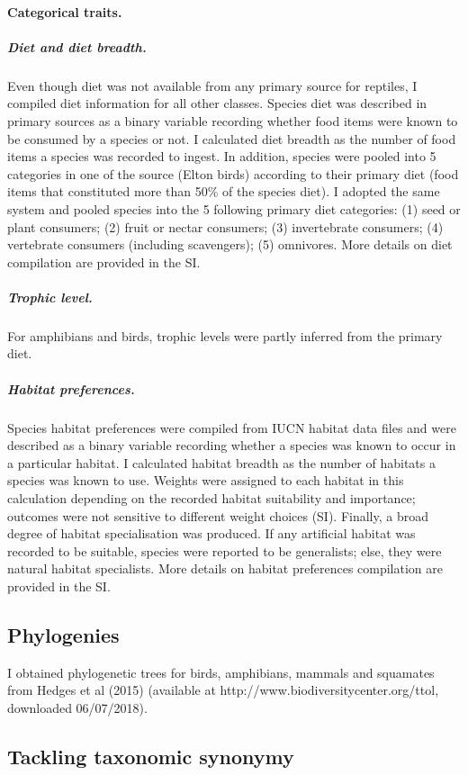 \paragraph{Categorical traits.}
\subparagraph{Diet and diet breadth.} Even though diet was not available from any primary source for reptiles, I compiled diet information for all other classes. Species diet was described in primary sources as a binary variable recording whether food items were known to be consumed by a species or not. I calculated diet breadth as the number of food items a species was recorded to ingest. In addition,  species were pooled into 5 categories in one of the source (Elton birds) according to their primary diet (food items that constituted more than 50\% of the species diet). I adopted the same system and  pooled species into the 5 following primary diet categories: (1) seed or plant consumers; (2) fruit or nectar consumers; (3) invertebrate consumers; (4) vertebrate consumers (including scavengers); (5) omnivores. More details on diet compilation are provided in the SI. 
\subparagraph{Trophic level.} For amphibians and birds, trophic levels were partly inferred from the primary diet. 
\subparagraph{Habitat preferences.}
Species habitat preferences were compiled from IUCN habitat data files and were described as a binary variable recording whether a species was known to occur in a particular habitat. I calculated habitat breadth as the number of habitats a species was known to use. Weights were assigned to each habitat in this calculation depending on the recorded habitat suitability and importance; outcomes were not sensitive to different weight choices (SI). Finally, a broad degree of habitat specialisation was produced. If any artificial habitat was recorded to be suitable, species were reported to be generalists; else, they were natural habitat specialists. More details on habitat preferences compilation are provided in the SI. 

\subsection{Phylogenies}
I obtained phylogenetic trees for birds, amphibians, mammals and squamates from Hedges et al (2015)
(available at http://www.biodiversitycenter.org/ttol, downloaded 06/07/2018).

\subsection{Tackling taxonomic synonymy}

